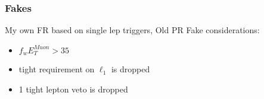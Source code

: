 \documentclass{beamer}
\begin{document}
\begin{frame}
    \frametitle{Fakes}
    My own FR based on single lep triggers,
    Old PR
    Fake considerations:
    \begin{itemize}
        \item $f_w E_{T}^{Muon} > 35$
        \item tight requirement on $\ell_{1}$ is dropped
        \item 1 tight lepton veto is dropped
    \end{itemize}
\end{frame}



\end{document}
